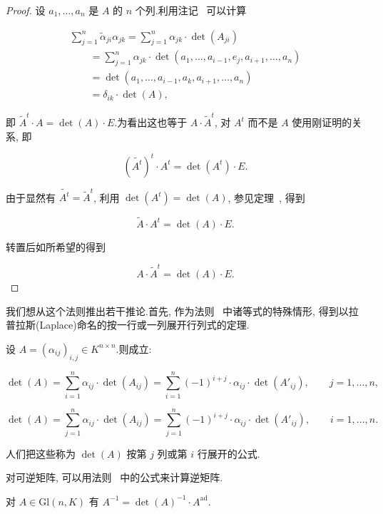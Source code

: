 \begin{proof}
设 $a_1, \ldots, a_n$ 是 $A$ 的 $n$ 个列.利用注记~ 可以计算

\[
\begin{array}{l}
\sum_{j = 1}^{n} \tilde{\alpha}_{ji} \alpha_{jk} = \sum_{j = 1}^{n} \alpha_{jk} \cdot \det(A_{ji}) \\
\qquad = \sum_{j = 1}^{n} \alpha_{jk} \cdot \det(a_1, \ldots, a_{i-1}, e_j, a_{i+1}, \ldots, a_n) \\
\qquad = \det(a_1, \ldots, a_{i-1}, a_k, a_{i+1}, \ldots, a_n) \\
\qquad = \delta_{ik} \cdot \det(A),
\end{array}
\]

即 $\tilde{A}^t \cdot A = \det(A) \cdot E$.为看出这也等于 $A \cdot \tilde{A}^t$, 对 $A^t$ 而不是 $A$ 使用刚证明的关系, 即

\[
(\widetilde{A^t})^t \cdot A^t = \det(A^t) \cdot E.
\]

由于显然有 $\widetilde{A^t} = \tilde{A}^t$, 利用 $\det(A^t) = \det(A)$, 参见定理~, 得到

\[
\tilde{A} \cdot A^t = \det(A) \cdot E.
\]

转置后如所希望的得到

\[
A \cdot \tilde{A}^t = \det(A) \cdot E.
\]
\end{proof}

我们想从这个法则推出若干推论.首先, 作为法则~ 中诸等式的特殊情形, 得到以拉普拉斯(Laplace)命名的按一行或一列展开行列式的定理.

\begin{corollary}[按行或按列展开]\label{cor:4.4.4}
设 $A = (\alpha_{ij})_{i, j} \in K^{n \times n}$.则成立:

\[
\det(A) = \sum_{i = 1}^{n} \alpha_{ij} \cdot \det(A_{ij}) = \sum_{i = 1}^{n} (-1)^{i + j} \cdot \alpha_{ij} \cdot \det(A'_{ij}), \qquad j = 1, \ldots, n,
\]

\[
\det(A) = \sum_{j = 1}^{n} \alpha_{ij} \cdot \det(A_{ij}) = \sum_{j = 1}^{n} (-1)^{i + j} \cdot \alpha_{ij} \cdot \det(A'_{ij}), \qquad i = 1, \ldots, n.
\]

人们把这些称为 $\det(A)$ 按第 $j$ 列或第 $i$ 行展开的公式.
\end{corollary}

对可逆矩阵, 可以用法则~ 中的公式来计算逆矩阵.

\begin{corollary}\label{cor:4.4.5}
对 $A \in \mathrm{Gl}(n, K)$ 有 $A^{-1} = \det(A)^{-1} \cdot A^{\mathrm{ad}}$.
\end{corollary}

